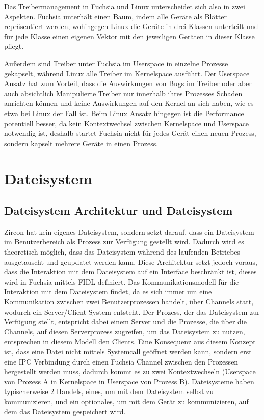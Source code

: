 \documentclass[a4paper]{scrartcl}
\begin{document}
Das Treibermanagement in Fuchsia und Linux unterscheidet sich also in zwei Aspekten. Fuchsia unterhält einen Baum, indem alle Geräte als Blätter repräsentiert werden, wohingegen Linux die Geräte in drei Klassen unterteilt und für jede Klasse einen eigenen Vektor mit den jeweiligen Geräten in dieser Klasse pflegt.

Außerdem sind Treiber unter Fuchsia im Userspace in einzelne Prozesse gekapselt, während Linux alle Treiber im Kernelspace ausführt. Der Userspace Ansatz hat zum Vorteil, dass die Auswirkungen von Bugs im Treiber oder aber auch absichtlich Manipulierte Treiber nur innerhalb ihres Prozesses Schaden anrichten können und keine Auswirkungen auf den Kernel an sich haben, wie es etwa bei Linux der Fall ist. Beim Linux Ansatz hingegen ist die Performance potentiell besser, da kein Kontextwechsel zwischen Kernelspace und Userspace notwendig ist, deshalb startet Fuchsia nicht für jedes Gerät einen neuen Prozess, sondern kapselt mehrere Geräte in einen Prozess.

\section{Dateisystem}
\label{sec:Dateisystem}
\subsection{Dateisystem Architektur und Dateisystem}
Zircon hat kein eigenes Dateisystem, sondern setzt darauf, dass ein Dateisystem im Benutzerbereich als Prozess zur Verfügung gestellt wird. Dadurch wird es theoretisch möglich, dass das Dateisystem während des laufenden Betriebes ausgetauscht und geupdatet werden kann. Diese Architektur setzt jedoch voraus, dass die Interaktion mit dem Dateisystem auf ein Interface beschränkt ist, dieses wird in Fuchsia mittels FIDL definiert.\cite{Fuchsia.FIDL.io}\cite{Fuchsia.FIDL.io2} Das Kommunikationsmodell für die Interaktion mit dem Dateisystem findet, da es sich immer um eine Kommunikation zwischen zwei Benutzerprozessen handelt, über Channels statt, wodurch ein Server/Client System entsteht. Der Prozess, der das Dateisystem zur Verfügung stellt, entspricht dabei einem Server und die Prozesse, die über die Channels, auf diesen Serverprozess zugreifen, um das Dateisystem zu nutzen, entsprechen in diesem Modell den Clients. Eine Konsequenz aus diesem Konzept ist, dass eine Datei nicht mittels Systemcall geöffnet werden kann, sondern erst eine IPC Verbindung durch einen Fuchsia Channel \cite{Fuchsia.Kernel.KernelObjects} zwischen den Prozessen hergestellt werden muss, dadurch kommt es zu zwei Kontextwechseln (Userspace von Prozess A in Kernelspace in Userspace von Prozess B). Dateisysteme haben typischerweise 2 Handels, eines, um mit dem Dateisystem selbst zu kommunizieren, und ein optionales, um mit dem Gerät zu kommunizieren, auf dem das Dateisystem gespeichert wird.
\end{document}
